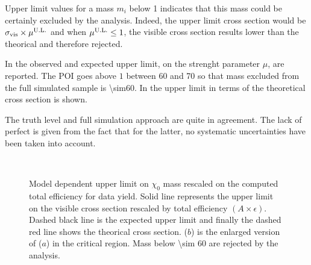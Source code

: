 Upper limit values for a mass $m_i$ below \num{1} indicates that this mass could be certainly excluded by the analysis. Indeed, the upper limit cross section would be $\sigma_\textup{vis}\times \mu^\textup{U.L.}$ and when $\mu^\textup{U.L.} \le 1$, the visible cross section results lower than the theorical and therefore rejected.

In \Tab{\ref{tab:mu}} the observed and expected upper limit, on the strenght parameter $\mu$, are reported. The POI goes above $1$ between \SI{60}{\gev} and \SI{70}{\gev} so that mass excluded from the full simulated sample is \SI{\sim60}{\gev}. In \Fig{\ref{fig:exclMD}} the upper limit in terms of the theoretical cross section is shown. 

The truth level and full simulation approach are quite in agreement. The lack of perfect is given from the fact that for the latter, no systematic uncertainties have been taken into account.



\begin{figure}[tp]
\centering
{} \\
 \quad
\caption{Model dependent upper limit on $\chi_0$ mass rescaled on the computed total efficiency for data yield. Solid line represents the upper limit on the visible cross section rescaled by total efficiency $\left(A\times\epsilon\right)$. Dashed black line is the expected upper limit and finally the dashed red line shows the theorical cross section. ($b$) is the enlarged version of ($a$) in the critical region. Mass below \SI{\sim 60}{\gev} are rejected by the analysis.}
\label{fig:exclMI}
\end{figure}










